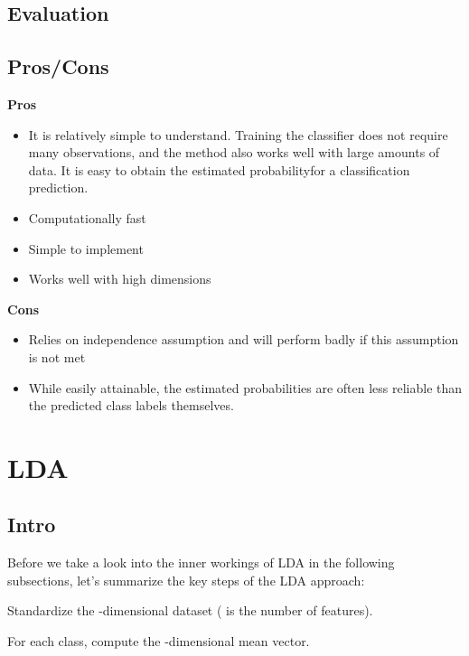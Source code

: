 \documentclass[]{book}
\begin{document}
\hypertarget{evaluation-10}{%
\subsection{Evaluation}\label{evaluation-10}}

\hypertarget{proscons-10}{%
\subsection{Pros/Cons}\label{proscons-10}}

\textbf{Pros}

\begin{itemize}
\item
  It is relatively simple to understand. Training the classifier does not require many observations, and the method also works well with large amounts of data. It is easy to obtain the estimated probabilityfor a classification prediction.
\item
  Computationally fast
\item
  Simple to implement
\item
  Works well with high dimensions
\end{itemize}

\textbf{Cons}

\begin{itemize}
\item
  Relies on independence assumption and will perform badly if this assumption is not met
\item
  While easily attainable, the estimated probabilities are often less reliable than the predicted class labels themselves.
\end{itemize}

\hypertarget{lda}{%
\section{LDA}\label{lda}}

\hypertarget{intro-11}{%
\subsection{Intro}\label{intro-11}}

Before we take a look into the inner workings of LDA in the following subsections, let's summarize the key steps of the LDA approach:

Standardize the -dimensional dataset ( is the number of features).

For each class, compute the -dimensional mean vector.
\end{document}
